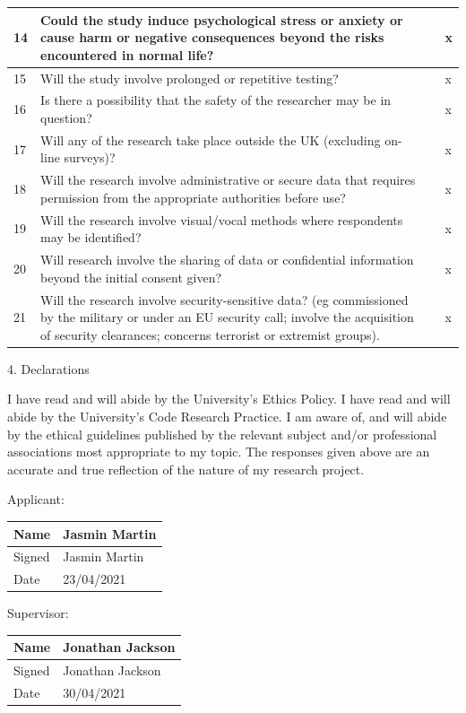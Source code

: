 \documentclass{article}
\begin{document}
\begin{longtable}[H]{|l|p{13cm}|l|l|}
14 & Could   the study induce psychological stress or anxiety or cause harm or negative   consequences beyond the risks encountered in normal life? &  & x \\ \hline
15 & Will the   study involve prolonged or repetitive testing? &  & x \\ \hline
16 & Is there   a possibility that the safety of the researcher may be in question? &  & x \\ \hline
17 & Will any   of the research take place outside the UK (excluding on-line surveys)? &  & x \\ \hline
18 & Will the   research involve administrative or secure data that requires permission from   the appropriate authorities before use? &  & x \\ \hline
19 & Will the   research involve visual/vocal methods where respondents may be identified? &  & x \\ \hline
20 & Will   research involve the sharing of data or confidential information beyond the   initial consent given? &  & x \\ \hline
21 & Will the   research involve security-sensitive data? (eg commissioned by the military or   under an EU security call; involve the acquisition of security clearances;   concerns terrorist or extremist groups). &  & x \\ \hline
\end{longtable}%

4. Declarations

I have read and will abide by the University’s Ethics Policy. 
I have read and will abide by the University’s Code Research Practice.
I am aware of, and will abide by the ethical guidelines published by the relevant subject and/or professional associations most appropriate to my topic.
The responses given above are an accurate and true reflection of the nature of my research project.

Applicant:
\begin{table}[H]
\small
\label{tab:my-table}
\begin{tabular}{|l|l|}
\hline
Name & Jasmin Martin \\ \hline
Signed & Jasmin Martin \\ \hline
Date & 23/04/2021 \\ \hline
\end{tabular}%
\end{table}

Supervisor:
\begin{table}[H]
\small
\label{tab:my-table}
\small
\begin{tabular}{|l|l|}
\hline
Name & Jonathan Jackson \\ \hline
Signed & Jonathan Jackson \\ \hline
Date & 30/04/2021 \\ \hline
\end{tabular}%
\end{table}
\end{document}
